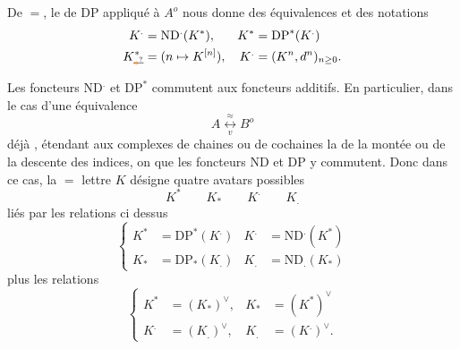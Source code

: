 De $=$, le  de DP appliqué à $A^o$ nous donne des équivalences
et des notations
\[
 \begin{aligned}
 K^{.}&=\mathrm{ND}^{.}(K^*), & K^*&=\mathrm{DP}^*(K^{.})\\
 K_{\deleted{\unsure{*}}}^{*}&=(n\mapsto K^{[n]}), &K^{.}&=(K^n,d^n)_{n\geq0}.
 \end{aligned}
\]

Les foncteurs $\mathrm{ND}^{.}$ et $\mathrm{DP}^*$ commutent aux foncteurs additifs. En particulier, dans le cas d'une équivalence
\[
 A\underset{v}{\overset{\approx}{\longleftrightarrow}}B^o
\]
déjà , étendant aux complexes de chaines ou de cochaines la  de la montée ou de la descente des indices, on  que les foncteurs ND et DP y commutent. Donc dans ce cas, la $=$ lettre $K$ désigne
quatre avatars possibles
\[
 K^*\qquad K_*\qquad K^{.}\qquad K_.
\]
liés par les relations ci dessus
\[
 \left\{\begin{aligned}
 K^*&=\mathrm{DP}^*(K^{.}) & K^{.}&=\mathrm{ND}^{.}(K^*)\\
 K_*&=\mathrm{DP}_*(K_.) & K_.&=\mathrm{ND}_ .(K_*)
 \end{aligned}\right.
\]
plus les relations
\[
 \left\{\begin{aligned}
 K^*&=(K_*)^\vee, & K_*&=(K^*)^\vee\\
 K^{.}&=(K_.)^\vee, & K_.&=(K^{.})^\vee .
 \end{aligned}\right.
\]

